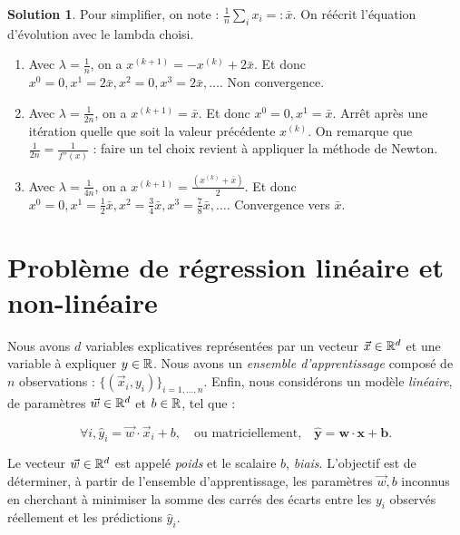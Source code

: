 \documentclass[a4paper,francais]{article}
\newcommand{\R}{{\ensuremath\mathbb{R}}}
\theoremstyle{definition}
\newtheorem*{solution}{Solution}
\begin{document}
\begin{solution}
  Pour simplifier, on note : $\frac{1}{n}\sum_ix_i =: \bar{x}$.
  On réécrit l'équation d'évolution avec le lambda choisi. 
  \begin{enumerate}
  \item Avec $\lambda = \frac{1}{n}$,
    on a $x^{(k+1)} = - x^{(k)} + 2\bar{x}$. Et donc
    $x^0 = 0, x^1 = 2\bar{x}, x^2 = 0, x^3 = 2\bar{x}, \dots$.
    Non convergence. 
  \item Avec $\lambda = \frac{1}{2n}$,
    on a $x^{(k+1)} = \bar{x}$. Et donc
    $x^0 = 0, x^1 = \bar{x}$. Arrêt après une itération
    quelle que soit la valeur précédente $x^{(k)}$.
    On remarque que $\frac{1}{2n} = \frac{1}{f''(x)}$ :
    faire un tel choix revient à appliquer la méthode de Newton. 
  \item Avec $\lambda = \frac{1}{4n}$,
    on a $x^{(k+1)} = \frac{(x^{(k)} + \bar{x})}{2}$. Et donc
    $x^0 = 0, x^1 = \frac{1}{2}\bar{x}, x^2 = \frac{3}{4}\bar{x},
    x^3 = \frac{7}{8}\bar{x}, \dots$.
    Convergence vers $\bar{x}$. 
  \end{enumerate}
\end{solution}

\section{Problème de régression linéaire et non-linéaire}
\label{sec:regression}

\newcommand\mat[1]{\mathbf{#1}}


Nous avons $d$ variables explicatives représentées par un vecteur $\vec{x} \in \R^d$
et une variable à expliquer $y \in \R$.
Nous avons un \emph{ensemble d'apprentissage} composé de $n$ observations :
$\{(\vec{x}_i,y_i)\}_{i = 1,\dots, n}$.
Enfin, nous considérons un modèle \emph{linéaire}, de paramètres $\vec{w} \in \R^d$
et $b \in \R$, tel que :

\[ \forall i, \hat{y}_i = \vec{w} \cdot \vec{x}_i + b, 
\quad \text{ou matriciellement,} \quad
\mat{\hat{y}} = \mat{w} \cdot \mat{x} + \mat{b}. \]

Le vecteur $\vec{w} \in \R^d$ est appelé \emph{poids}
et le scalaire $b$, \emph{biais}. 
L'objectif est de déterminer, à partir de l'ensemble d'apprentissage,
les paramètres $\vec{w},b$ inconnus en cherchant à minimiser la somme
des carrés des écarts entre les $y_i$ observés réellement et les prédictions $\hat{y}_i$.
\end{document}
